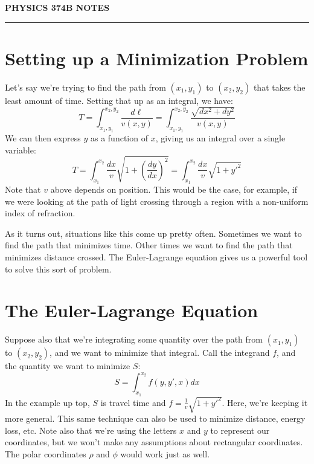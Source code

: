 \documentclass[10pt]{article}
\begin{document}
\setlength{\parindent}{0in}
\setlength{\parskip}{1em}

\begin{center}
{\bf PHYSICS 374B NOTES}
\end{center}
\hrule
\vskip0.15in

\section*{Setting up a Minimization Problem}

Let's say we're trying to find the path from $\left( x_1, y_1 \right)$ to $\left( x_2, y_2 \right)$ that takes the least amount of time. Setting that up as an integral, we have:
$$
T = \displaystyle\int_{x_1, y_1}^{x_2, y_2} \frac{d\ell}{v(x, y)} =
\displaystyle\int_{x_1, y_1}^{x_2, y_2} \frac{ \sqrt{dx^2 + dy^2} }{v(x, y)}
$$
We can then express $y$ as a function of $x$, giving us an integral over a single variable:
$$
T =
\displaystyle\int_{x_1}^{x_2} \frac{dx}{v} \sqrt{1 + \left( \frac{dy}{dx} \right)^2} =
\displaystyle\int_{x_1}^{x_2} \frac{dx}{v} \sqrt{1 + y'^2}
$$
Note that $v$ above depends on position. This would be the case, for example, if we were looking at the path of light crossing through a region with a non-uniform index of refraction. 

As it turns out, situations like this come up pretty often. Sometimes we want to find the path that minimizes time. Other times we want to find the path that minimizes distance crossed. The Euler-Lagrange equation gives us a powerful tool to solve this sort of problem.

\section*{The Euler-Lagrange Equation}

Suppose also that we're integrating some quantity over the path from $\left( x_1, y_1 \right)$ to $\left( x_2, y_2 \right)$, and we want to minimize that integral. Call the integrand $f$, and the quantity we want to minimize $S$:
$$
S = \displaystyle\int_{x_1}^{x_2} f(y, y', x) dx
$$
In the example up top, $S$ is travel time and $f=\frac{1}{v}\sqrt{1+y'^2}$. Here, we're keeping it more general. This same technique can also be used to minimize distance, energy loss, etc. Note also that we're using the letters $x$ and $y$ to represent our coordinates, but we won't make any assumptions about rectangular coordinates. The polar coordinates $\rho$ and $\phi$ would work just as well.
\end{document}
